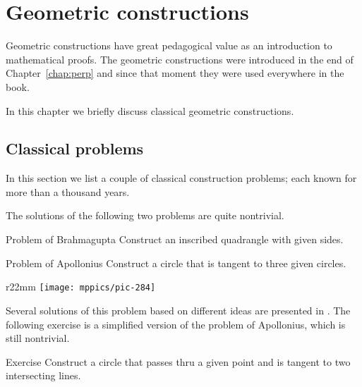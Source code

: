 \chapter{Geometric constructions}
\label{chap:car}


Geometric constructions have great pedagogical value 
as an introduction to mathematical proofs.
The geometric constructions were introduced in the end of Chapter~\ref{chap:perp}
and since that moment they were used everywhere in the book.

In this chapter we briefly discuss classical geometric constructions.

%
%

\section*{Classical problems}

In this section we list a couple of classical construction problems;
each known for more than a thousand years. 

The solutions of the following two problems are quite nontrivial.

\begin{thm}{Problem of Brahmagupta} 
Construct an inscribed quadrangle with given sides.
\end{thm}


 
\begin{thm}{Problem of Apollonius} Construct a circle that is tangent to three given circles.
\end{thm}

{

\begin{wrapfigure}{r}{22mm}
\vskip-10mm
\centering
\texttt{[image: mppics/pic-284]}
\end{wrapfigure}

Several solutions of this problem based on different ideas are presented in \cite{hadamard}. 
The following exercise is a simplified version of the problem of Apollonius, which is still nontrivial.

\begin{thm}{Exercise}\label{ex:simple-apollonius}
Construct a circle that passes thru a given point and is tangent to two intersecting lines.
\end{thm}

}



